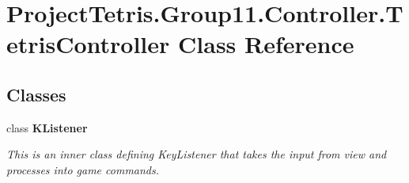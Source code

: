 \hypertarget{class_project_tetris_1_1_group11_1_1_controller_1_1_tetris_controller}{}\section{Project\+Tetris.\+Group11.\+Controller.\+Tetris\+Controller Class Reference}
\label{class_project_tetris_1_1_group11_1_1_controller_1_1_tetris_controller}
\subsection*{Classes}
\begin{DoxyCompactItemize}
\item 
class {\bfseries K\+Listener}
\begin{DoxyCompactList}\small\item\em This is an inner class defining Key\+Listener that takes the input from view and processes into game commands. \end{DoxyCompactList}\end{DoxyCompactItemize}
